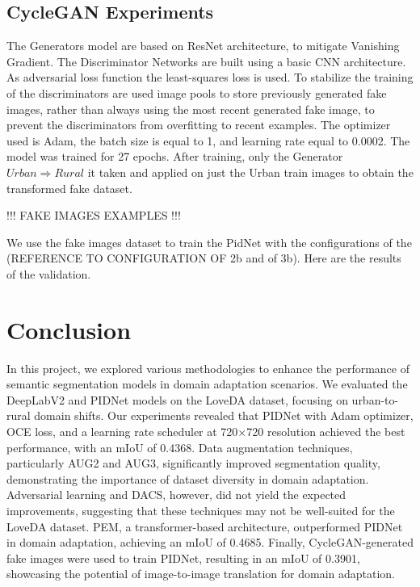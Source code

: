 \documentclass[10pt,twocolumn,letterpaper]{article}
\begin{document}
\subsection{CycleGAN Experiments}
The Generators model are based on ResNet architecture, to mitigate Vanishing Gradient. The Discriminator Networks are built using a basic CNN architecture. As adversarial loss function the least-squares loss is used. To stabilize the training of the discriminators are used image pools to store previously generated fake images, rather than always using the most recent generated fake image, to prevent the discriminators from overfitting to recent examples. The optimizer used is Adam, the batch size is equal to 1, and learning rate equal to 0.0002. The model was trained for 27 epochs. 
After training, only the Generator $Urban \Rightarrow Rural$
it taken and applied on just the Urban train images to obtain the transformed fake dataset.

!!! FAKE IMAGES EXAMPLES !!!

We use the fake images dataset to train the PidNet with the configurations of the (REFERENCE TO CONFIGURATION OF 2b and of 3b). Here are the results of the validation.


\begin{table}[ht]
\centering
{}
\caption{Performance of PIDNet on Fake Images}
\end{table}




\section{Conclusion}

In this project, we explored various methodologies to enhance the performance of semantic segmentation models in domain adaptation scenarios. We evaluated the DeepLabV2 and PIDNet models on the LoveDA dataset, focusing on urban-to-rural domain shifts. Our experiments revealed that PIDNet with Adam optimizer, OCE loss, and a learning rate scheduler at 720×720 resolution achieved the best performance, with an mIoU of 0.4368. Data augmentation techniques, particularly AUG2 and AUG3, significantly improved segmentation quality, demonstrating the importance of dataset diversity in domain adaptation. Adversarial learning and DACS, however, did not yield the expected improvements, suggesting that these techniques may not be well-suited for the LoveDA dataset. PEM, a transformer-based architecture, outperformed PIDNet in domain adaptation, achieving an mIoU of 0.4685. Finally, CycleGAN-generated fake images were used to train PIDNet, resulting in an mIoU of 0.3901, showcasing the potential of image-to-image translation for domain adaptation. 



\end{document}
